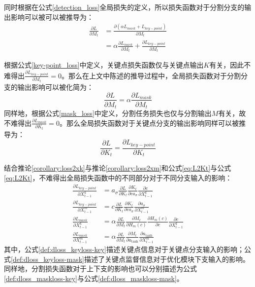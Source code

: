 同时根据在公式\eqref{detection_loss}全局损失的定义，所以损失函数对于分割分支的输出影响可以被可以被推导为：
\begin{equation*}
\begin{aligned}
\frac{\partial L}{\partial M_t} &= \frac{\partial (\alpha L_{mask} + L_{key-point})}{\partial M_t}\\
&= \alpha\frac{\partial L_{mask}}{\partial M_t} + \frac{\partial L_{key-point}}{\partial M_t}
\end{aligned}
\end{equation*}

根据公式\eqref{key-point_loss}中定义，关键点损失函数仅与关键点输出$K$有关，因此不难得出$\frac{\partial L_{key-point}}{\partial M_t}=0$。那么在上文中陈述的推导过程中，全局损失函数对于分割分支的输出影响可以被化简为：
\begin{equation}
\label{eq:L2Mt}
\frac{\partial L}{\partial M_t} = \alpha\frac{\partial L_{mask}}{\partial M_t}
\end{equation}
同样地，根据公式\eqref{mask_loss}中定义，分割任务损失也仅与分割输出$M$有关，故不难得出$\frac{\partial L_{mask}}{\partial K_t}=0$。那么全局损失函数对于关键点分支的输出影响同样可以被推导为：
\begin{equation}
\label{eq:L2Kt}
\frac{\partial L}{\partial K_t} = \frac{\partial L_{key-point}}{\partial K_t}
\end{equation}

结合推论\ref{corollary:loss2xk}与推论\ref{corollary:loss2xm}和公式\eqref{eq:L2Kt}与公式\eqref{eq:L2Kt}，不难得出全局损失函数中的不同部分对于不同分支输入的影响：
\begin{align}
\frac{\partial L_{key-point}}{\partial X^k_{t-1}} &= a_{\sigma}\frac{\partial L}{\partial K_t}\frac{\partial K_t}{\partial ca_{\sigma}}\frac{\partial c}{\partial X_{t-1}^k}\label{def:dloss_keyloss-key}\\
\frac{\partial L_{key-point}}{\partial X^m_{t-1}} &= c\frac{\partial L}{\partial K_t}\frac{\partial K_t}{\partial ca_{\sigma}}\frac{\partial a_{\sigma}}{\partial X^m_{t-1}}\label{def:dloss_keyloss-mask}\\
\frac{\partial L_{mask}}{\partial X^k_{t-1}} &= \alpha\frac{\partial L}{\partial M_t}\frac{\partial M_t}{\partial H_m(c)}\frac{\partial H_m(c)}{\partial c}\frac{\partial c}{\partial X_{t-1}^k}\label{def:dloss_maskloss-key}\\
\frac{\partial L_{mask}}{\partial X^m_{t-1}} &= \alpha\frac{\partial L}{\partial M_t}\frac{\partial M_t}{\partial a_{\tanh}}\frac{\partial a_{\tanh}}{\partial X^m_{t-1}}\label{def:dloss_maskloss-mask}
\end{align}
其中，公式\eqref{def:dloss_keyloss-key}描述关键点信息对于关键点分支输入的影响；公式\eqref{def:dloss_keyloss-mask}描述了关键点监督信息对于优化模块下支输入的影响。同样地，分割损失函数对于上下支的影响也可以分别描述为公式\eqref{def:dloss_maskloss-key}与公式\eqref{def:dloss_maskloss-mask}。

